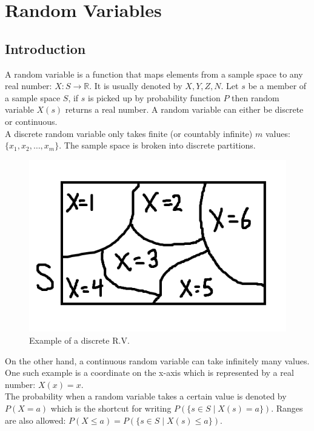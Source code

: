 \section{Random Variables}

\subsection{Introduction}

A random variable is a function that maps elements from a sample space to any real number: $X : S\to\mathbb{R}$. It is usually denoted by $X, Y, Z, N$. Let $s$ be a member of a sample space $S$, if $s$ is picked up by probability function $P$ then random variable $X(s)$ returns a real number. A random variable can either be discrete or continuous. \\

A discrete random variable only takes finite (or countably infinite) $m$ values: $\{x_1, x_2, \dots, x_m\}$. The sample space is broken into discrete partitions.

\begin{figure}[H]
	\centering
	\includegraphics[width=120mm]{4.png}
	\caption{Example of a discrete R.V.}
\end{figure}

On the other hand, a continuous random variable can take infinitely many values. One such example is a coordinate on the x-axis which is represented by a real number: $X(x)=x$. \\

The probability when a random variable takes a certain value is denoted by $P(X=a)$ which is the shortcut for writing $P(\{s \in S \mid X(s)=a\})$. Ranges are also allowed: $P(X\le a)=P(\{s \in S \mid X(s)\le a\})$.

